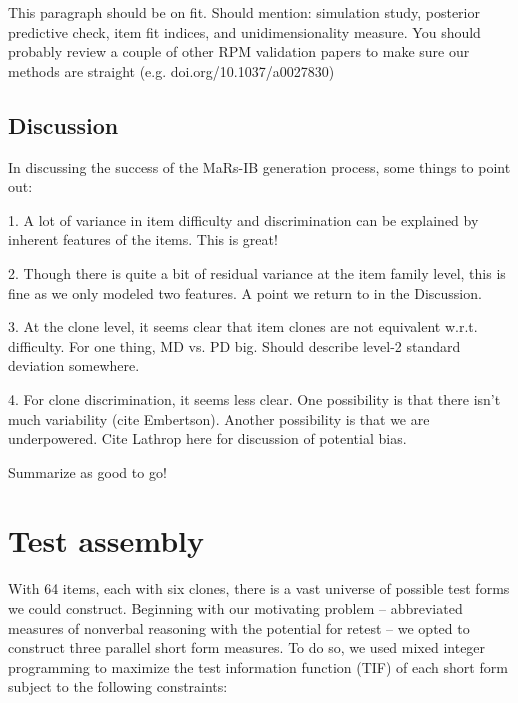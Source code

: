 \documentclass[a4paper,man,natbib]{apa6}
\begin{document}
This paragraph should be on fit. Should mention: simulation study, posterior predictive check, item fit indices, and unidimensionality measure. You should probably review a couple of other RPM validation papers to make sure our methods are straight (e.g. doi.org/10.1037/a0027830)

\subsection{Discussion}

In discussing the success of the MaRs-IB generation process, some things to point out:

1. A lot of variance in item difficulty and discrimination can be explained by inherent features of the items. This is great!

2. Though there is quite a bit of residual variance at the item family level, this is fine as we only modeled two features. A point we return to in the Discussion.

3. At the clone level, it seems clear that item clones are not equivalent w.r.t. difficulty. For one thing, MD vs. PD big. Should describe level-2 standard deviation somewhere. 

4. For clone discrimination, it seems less clear. One possibility is that there isn't much variability (cite Embertson). Another possibility is that we are underpowered. Cite Lathrop here for discussion of potential bias.

Summarize as good to go!

\section{Test assembly}

With 64 items, each with six clones, there is a vast universe of possible test forms we could construct. Beginning with our motivating problem -- abbreviated measures of nonverbal reasoning with the potential for retest -- we opted to construct three parallel short form measures. To do so, we used mixed integer programming \citep{der2005wj} to maximize the test information function (TIF) of each short form subject to the following constraints:
\end{document}
